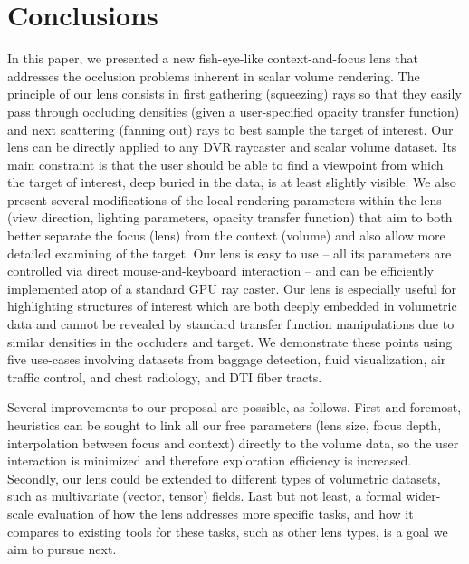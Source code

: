 \section{Conclusions}
\label{sec:conclusions}
%
In this paper, we presented a new fish-eye-like context-and-focus lens that addresses the occlusion problems inherent in scalar volume rendering. The principle of our lens consists in first gathering (squeezing) rays so that they easily pass through occluding densities (given a user-specified opacity transfer function) and next scattering (fanning out) rays to best sample the target of interest. Our lens can be directly applied to any DVR raycaster and scalar volume dataset. Its main constraint is that the user should be able to find a viewpoint from which the target of interest, deep buried in the data, is at least slightly visible. We also present several modifications of the local rendering parameters within the lens (view direction, lighting parameters, opacity transfer function) that aim to both better separate the focus (lens) from the context (volume) and also allow more detailed examining of the target. Our lens is easy to use -- all its parameters are controlled via direct mouse-and-keyboard interaction -- and can be efficiently implemented atop of a standard GPU ray caster. Our lens is especially useful for highlighting structures of interest which are both deeply embedded in volumetric data and cannot be revealed by standard transfer function manipulations due to similar densities in the occluders and target. We demonstrate these points using five use-cases involving datasets from baggage detection, fluid visualization, air traffic control, and chest radiology, and DTI fiber tracts.

Several improvements to our proposal are possible, as follows. First and foremost, heuristics can be sought to link all our free parameters (lens size, focus depth, interpolation between focus and context) directly to the volume data, so the user interaction is minimized and therefore exploration efficiency is increased. Secondly, our lens could be extended to different types of volumetric datasets, such as multivariate (vector, tensor) fields. Last but not least, a formal wider-scale evaluation of how the lens addresses more specific tasks, and how it compares to existing tools for these tasks, such as other lens types, is a goal we aim to pursue next.
